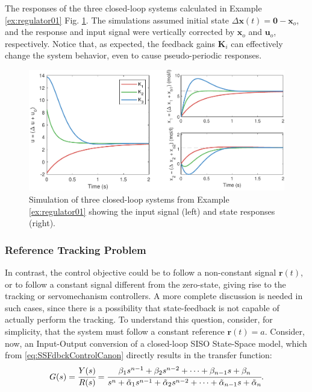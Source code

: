 \documentclass[a4paper,11pt]{book}
\numberwithin{figure}{chapter}
\numberwithin{equation}{chapter}
\numberwithin{table}{chapter}
\theoremstyle{definition}
\begin{document}
The responses of the three closed-loop systems calculated in Example \ref{ex:regulator01} Fig. \ref{fig:regulator01}. The simulations assumed initial state $\Delta \bm{x}(t) = \bm{0} - \bm{x}_o$, and the response and input signal were vertically corrected by $\bm{x}_o$ and $\bm{u}_o$, respectively. Notice that, as expected, the feedback gains $\bm{K}_i$ can effectively change the system behavior, even to cause pseudo-periodic responses.

\begin{figure}[ht] \centering
    \includegraphics[width=\textwidth]{chapter3/report_ch3_1}
    
    \caption{Simulation of three closed-loop systems from Example \ref{ex:regulator01} showing the input signal (left) and state responses (right).}
    \label{fig:regulator01}
\end{figure}

\subsubsection{Reference Tracking Problem}

In contrast, the control objective could be to follow a non-constant signal $\bm{r}(t)$, or to follow a constant signal different from the zero-state, giving rise to the tracking or servomechanism controllers. A more complete discussion is needed in such cases, since there is a possibility that state-feedback is not capable of actually perform the tracking. To understand this question, consider, for simplicity, that the system must follow a constant reference $\bm{r}(t) = a$. Consider, now, an Input-Output conversion of a closed-loop SISO State-Space model, which from \eqref{eq:SSFdbckControlCanon} directly results in the transfer function:
\begin{equation}
    G(s) = \cfrac{Y(s)}{R(s)} = \cfrac{\beta_1 s^{n-1} + \beta_2 s^{n-2} + \cdots + \beta_{n-1} s + \beta_n}{s^{n} + \tilde{\alpha}_1 s^{n-1} + \tilde{\alpha}_2 s^{n-2} + \cdots + \tilde{\alpha}_{n-1} s + \tilde{\alpha}_n}
.\end{equation}
\end{document}
